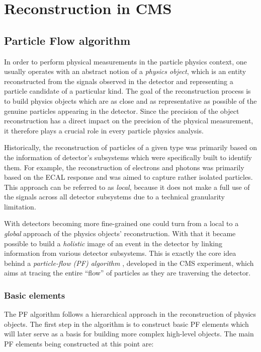 \section{Reconstruction in CMS}
\subsection{Particle Flow algorithm} \label{pf}
In order to perform physical measurements in the particle physics context, one usually operates with an abstract notion of a \textit{physics object}, which is an entity reconstructed from the signals observed in the detector and representing a particle candidate of a particular kind. The goal of the reconstruction process is to build physics objects which are as close and as representative as possible of the genuine particles appearing in the detector. Since the precision of the object reconstruction has a direct impact on the precision of the physical measurement, it therefore plays a crucial role in every particle physics analysis.

Historically, the reconstruction of particles of a given type was primarily based on the information of detector's subsystems which were specifically built to identify them. For example, the reconstruction of electrons and photons was primarily based on the ECAL response and was aimed to capture rather isolated particles. This approach can be referred to as \textit{local}, because it does not make a full use of the signals across all detector subsystems due to a technical granularity limitation. 

With detectors becoming more fine-grained one could turn from a local to a \textit{global} approach of the physics objects' reconstruction. With that it became possible to build a \textit{holistic} image of an event in the detector by linking information from various detector subsystems. This is exactly the core idea behind a \textit{particle-flow (PF) algorithm} \cite{CMS:2017yfk}, developed in the CMS experiment, which aims at tracing the entire \enquote{flow} of particles as they are traversing the detector.

\subsubsection{Basic elements}\label{sec:pf_base}
The PF algorithm follows a hierarchical approach in the reconstruction of physics objects. The first step in the algorithm is to construct basic PF elements which will later serve as a basis for building more complex high-level objects. The main PF elements being constructed at this point are:

